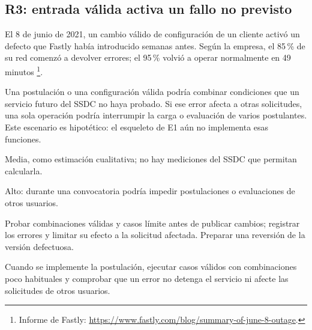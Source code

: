 \subsection{R3: entrada válida activa un fallo no previsto}

\begin{description}[leftmargin=!,labelwidth=4.2cm,style=nextline]
  \item[Incidente de origen]
    El 8 de junio de 2021, un cambio válido de configuración de un
    cliente activó un defecto que Fastly había introducido semanas
    antes. Según la empresa, el 85\,\% de su red comenzó a devolver
    errores; el 95\,\% volvió a operar normalmente en 49 minutos
    \footnote{Informe de Fastly:
    \url{https://www.fastly.com/blog/summary-of-june-8-outage}.}.

  \item[Relación con el SSDC]
    Una postulación o una configuración válida podría combinar
    condiciones que un servicio futuro del SSDC no haya probado.
    Si ese error afecta a otras solicitudes, una sola operación
    podría interrumpir la carga o evaluación de varios postulantes.
    Este escenario es hipotético: el esqueleto de E1 aún no implementa
    esas funciones.

  \item[Probabilidad]
    Media, como estimación cualitativa; no hay mediciones del SSDC
    que permitan calcularla.

  \item[Impacto]
    Alto: durante una convocatoria podría impedir postulaciones
    o evaluaciones de otros usuarios.

  \item[Medida propuesta]
    Probar combinaciones válidas y casos límite antes de publicar
    cambios; registrar los errores y limitar su efecto a la solicitud
    afectada. Preparar una reversión de la versión defectuosa.

  \item[Verificación]
    Cuando se implemente la postulación, ejecutar casos válidos con
    combinaciones poco habituales y comprobar que un error no detenga
    el servicio ni afecte las solicitudes de otros usuarios.
\end{description}
